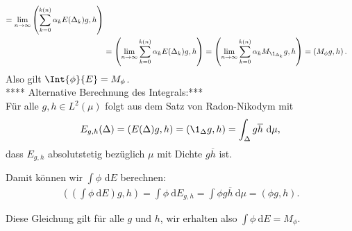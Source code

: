\begin{solution}
\begin{align*}
  = \lim_{n \to \infty}\left(\sum_{k=0}^{k(n)}\alpha_kE(\Delta_k)g,h\right) \\
  &= \left(\lim_{n \to \infty}\sum_{k=0}^{k(n)}\alpha_kE(\Delta_k)g,h\right)
  = \left(\lim_{n \to \infty}\sum_{k=0}^{k(n)}\alpha_kM_{\1_{\Delta_k}}g,h\right)
  = \left(M_{\phi}g,h\right).
\end{align*}
Also gilt $\Int{\phi}{E} = M_{\phi}$. \\
**** Alternative Berechnung des Integrals:*** \\
Für alle $g, h \in L^2(\mu)$ folgt aus dem Satz von Radon-Nikodym mit
\begin{align*}
    E_{g, h}(\Delta) = (E(\Delta) g, h) = (\1_\Delta g, h) = \int_{\Delta} g \overline h~\mathrm{d} \mu,
\end{align*}
dass $E_{g, h}$ absolutstetig bezüglich $\mu$ mit Dichte $g\overline h$ ist.

Damit können wir $\int \phi$ d$E$ berechnen:
\begin{align*}
    \left(\left(\int \phi ~\mathrm{d}E\right)g, h\right) =
    \int \phi ~\mathrm{d}E_{g,h} = \int \phi g \overline h~\mathrm{d} \mu = (\phi g, h).
\end{align*}

Diese Gleichung gilt für alle $g$ und $h$, wir erhalten also $\int \phi ~\mathrm{d}E = M_\phi$.
\end{solution}
